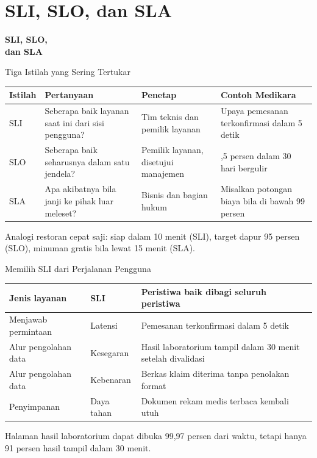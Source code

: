 \documentclass[aspectratio=169, table, 12pt]{beamer}
\begin{document}
\section{SLI, SLO, dan SLA}

\begin{frame}{\hfill}
  \centering
  \Huge{\textbf{SLI, SLO,\\dan SLA}}
\end{frame}

\begin{frame}{{\Large Tiga Istilah yang Sering Tertukar}}
  \footnotesize
  \begin{tabularx}{\textwidth}{>{\raggedright\arraybackslash}p{1.2cm}
      >{\raggedright\arraybackslash}X >{\raggedright\arraybackslash}p{2.8cm}
      >{\raggedright\arraybackslash}X}
    \hline
    \textbf{Istilah} & \textbf{Pertanyaan} & \textbf{Penetap} & \textbf{Contoh Medikara} \\
    \hline
    SLI & Seberapa baik layanan saat ini dari sisi pengguna? & Tim teknis dan pemilik
      layanan & Upaya pemesanan terkonfirmasi dalam 5 detik \\
    \hline
    SLO & Seberapa baik seharusnya dalam satu jendela? & Pemilik layanan, disetujui
      manajemen & 99,5 persen dalam 30 hari bergulir \\
    \hline
    SLA & Apa akibatnya bila janji ke pihak luar meleset? & Bisnis dan bagian hukum &
      Misalkan potongan biaya bila di bawah 99 persen \\
    \hline
  \end{tabularx}

  \vspace{10pt}
  \small
  Analogi restoran cepat saji: siap dalam 10 menit (SLI), target dapur 95 persen (SLO),
  minuman gratis bila lewat 15 menit (SLA).
\end{frame}

\begin{frame}{{\Large Memilih SLI dari Perjalanan Pengguna}}
  \footnotesize
  \begin{tabularx}{\textwidth}{>{\raggedright\arraybackslash}p{3.0cm}
      >{\raggedright\arraybackslash}p{2.2cm} >{\raggedright\arraybackslash}X}
    \hline
    \textbf{Jenis layanan} & \textbf{SLI} & \textbf{Peristiwa baik dibagi seluruh peristiwa}
      \\
    \hline
    Menjawab permintaan & Latensi & Pemesanan terkonfirmasi dalam 5 detik \\
    \hline
    Alur pengolahan data & Kesegaran & Hasil laboratorium tampil dalam 30 menit setelah
      divalidasi \\
    \hline
    Alur pengolahan data & Kebenaran & Berkas klaim diterima tanpa penolakan format \\
    \hline
    Penyimpanan & Daya tahan & Dokumen rekam medis terbaca kembali utuh \\
    \hline
  \end{tabularx}

  \vspace{10pt}
  \small
  Halaman hasil laboratorium dapat dibuka 99,97 persen dari waktu, tetapi hanya 91 persen
  hasil tampil dalam 30 menit.
\end{frame}
\end{document}
